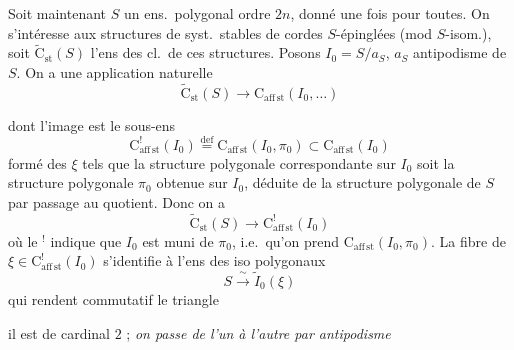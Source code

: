 \documentclass[11pt,a4paper]{article}
\begin{document}
Soit maintenant $S$ un ens.\ polygonal   ordre $2n$, donné une fois pour toutes. On s'intéresse aux structures de syst.\ stables de cordes $S$-épinglées (mod $S$-isom.), soit $\widetilde{\mathrm{C}}_{\mathrm{st}}(S)$ l'ens des cl.\ de ces structures. Posons
$I_0 = S / a_S$, \quad $a_S$ antipodisme de $S$.
On a une application naturelle
\[
\widetilde{\mathrm{C}}_{\mathrm{st}}(S) \longrightarrow \mathrm{C}_{\mathrm{aff}\,\mathrm{st}}(I_0, \ldots)
\]

dont l'image est le sous-ens
\[
\mathrm{C}^{!}_{\mathrm{aff}\,\mathrm{st}}(I_0) \overset{\mathrm{def}}{=} \mathrm{C}_{\mathrm{aff}\,\mathrm{st}}(I_0, \pi_0) \subset \mathrm{C}_{\mathrm{aff}\,\mathrm{st}}(I_0)
\]
formé des $\xi$ tels que la structure polygonale correspondante sur $I_0$ soit la structure polygonale $\pi_0$ obtenue sur $I_0$, déduite de la structure polygonale de $S$ par passage au quotient. Donc on a
\[
\widetilde{\mathrm{C}}_{\mathrm{st}}(S) \longrightarrow \mathrm{C}^{!}_{\mathrm{aff}\,\mathrm{st}}(I_0)
\]
où le ${}^{!}$ indique que $I_0$ est muni de $\pi_0$, i.e.\ qu'on prend $\mathrm{C}_{\mathrm{aff}\,\mathrm{st}}(I_0, \pi_0)$. La  fibre de $\xi \in \mathrm{C}^{!}_{\mathrm{aff}\,\mathrm{st}}(I_0)$ s'identifie à l'ens des iso polygonaux
\[
S \xrightarrow{\ \sim\ } \widetilde{I}_0(\xi)
\]
qui  rendent commutatif le triangle


il est de cardinal $2$ ; \emph{on passe de l'un à l'autre par antipodisme}

\end{document}
